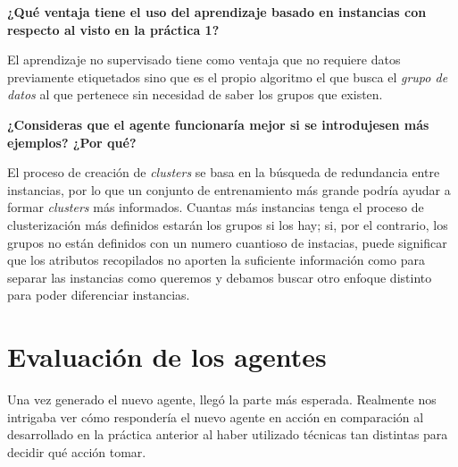 \documentclass[12pt]{article}
\begin{document}
\vspace{0.5cm}
\begin{center}
    \textbf{¿Qué ventaja tiene el uso del aprendizaje basado en instancias con respecto al visto en la práctica 1?}
\end{center}
\vspace{0.5cm}

El aprendizaje no supervisado tiene como ventaja que no requiere datos previamente etiquetados sino que es el propio algoritmo el que busca el \textit{grupo de datos} al que pertenece sin necesidad de saber los grupos que existen.

\vspace{0.5cm}
\begin{center}
    \textbf{¿Consideras que el agente funcionaría mejor si se introdujesen más ejemplos? ¿Por qué?}
\end{center}
\vspace{0.5cm}

El proceso de creación de \textit{clusters} se basa en la búsqueda de redundancia entre instancias, por lo que un conjunto de entrenamiento más grande podría ayudar a formar \textit{clusters} más informados. Cuantas más instancias tenga el proceso de clusterización más definidos estarán los grupos si los hay; si, por el contrario, los grupos no están definidos con un numero cuantioso de instacias, puede significar que los atributos recopilados no aporten la suficiente información como para separar las instancias como queremos y debamos buscar otro enfoque distinto para poder diferenciar instancias.

\newpage
\section{Evaluación de los agentes}


Una vez generado el nuevo agente, llegó la parte más esperada. Realmente nos intrigaba ver cómo respondería el nuevo agente en acción en comparación al desarrollado en la práctica anterior al haber utilizado técnicas tan distintas para decidir qué acción tomar.

\end{document}
